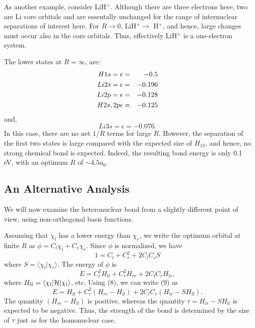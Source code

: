 As another example, consider LiH$^+$.  Although there are three electrons
here, two are Li core orbitals and are essentally unchanged for the range of
internuclear separations of interest here.  For $R \rightarrow 0$, 
LiH$^+ \rightarrow$ H$^+$, and hence, large changes must occur also 
in the core orbitals.  Thus, effectively LiH$^+$ is a one-electron system.

The lower states at $R = \infty$, are:
\begin{eqnarray}
H1s = \epsilon &=& -0.5\cr
Li2s = \epsilon &=& -0.196\cr
Li2p = \epsilon &=& -0.128\cr
H2s, 2p \epsilon &=& -0.125
\end{eqnarray}
and,
\begin{equation}
Li3s = \epsilon = -0.076.
\end{equation}
In this case, there are no net $1/R$ terms for large $R$.  However, the 
separation of the first two states is large compared with the expected 
size of $H_{12}$, and
hence, no strong chemical bond is expected.  Indeed, the resulting bond
energy is only 0.1 eV, with an optimum $R$ of $\sim4.5 a_0$.

\subsection{An Alternative Analysis}

We will now examine the heteronuclear bond from a slightly different
point of view, using non-orthogonal basis functions.

Assuming that $\chi_l$ has a lower energy than $\chi_r$, we write the optimum
orbital at finite $R$ as $\phi = C_l \chi_l + C_r \chi_r$.  Since 
$\phi$ is normalized, we have
\begin{equation}
1 = C_l + C^2_r + 2C_l C_r S
\label{chap17-eqno8}
\end{equation}
where $S = \langle \chi_l | \chi_r \rangle$. The energy of $\phi$ is
\begin{equation}
E = C^2_l H_{ll} + C^2_rH_{rr} + 2 C_lC_rH_{lr},
\label{chap17-eqno9}
\end{equation}
where $H_{ll} = \langle \chi_l | {\cal H} | \chi_l \rangle$,
etc.  Using (8), we can write (9) as
\begin{equation}
E = H_{ll} + C^2_r \left( H_{rr} - H_{ll} \right) + 2 C_l C_r \left( 
H_{lr} - SH_{ll} \right).
\end{equation}
The quantity $(H_{rr} - H_{ll})$ is positive, whereas the quantity 
$\tau = H_{lr} - SH_{ll}$ is expected to be negative.  Thus, the strength 
of the bond is determined by the size of $\tau$ just as for the 
homonuclear case.

